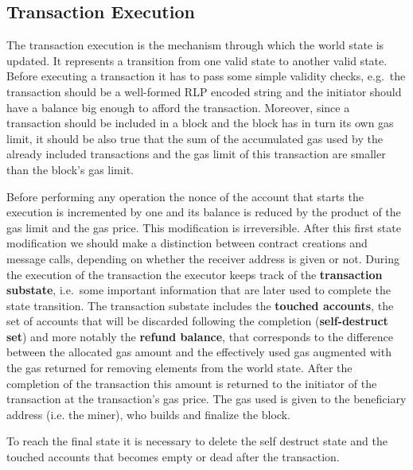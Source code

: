 \subsection{Transaction Execution}
The transaction execution is the mechanism through which the world state is
updated. It represents a transition from one
valid state to another valid state. Before executing a transaction it
has to pass some simple validity checks, e.g.\ the transaction should be a
well-formed RLP encoded string and the initiator should have a balance big
enough to afford the transaction.
Moreover, since a transaction should be included in a block and the block
has in turn its own gas limit, it should be also true that the sum 
of the accumulated gas used by the already included transactions and the gas
limit of this transaction are smaller than the block's gas limit.

Before performing any operation the nonce of the 
account that starts the execution is incremented by one and its balance is
reduced by the product of the gas limit and the gas price. This modification
is irreversible.
After this first state modification we should  make a distinction between
contract creations and message calls, depending on whether the receiver
address is given or not.
During the execution of the transaction the executor keeps track of the
\textbf{transaction substate}, i.e.\ some important information that
are later used to complete the state transition.
The transaction substate includes the \textbf{touched accounts}, the set of
accounts that will be discarded following the completion (\textbf{self-destruct
set}) and more notably the
\textbf{refund balance}, that corresponds
to the difference between the allocated gas amount and the effectively used
gas augmented with the gas returned for removing elements from the world
state. After the completion of the transaction this amount is returned to the
initiator of the transaction at the transaction's gas price.
The gas used is given to the beneficiary address (i.e. the miner), who builds 
and finalize the block.

To reach the final state it is necessary to delete the self destruct state and
the touched accounts that becomes empty or dead after the transaction.
